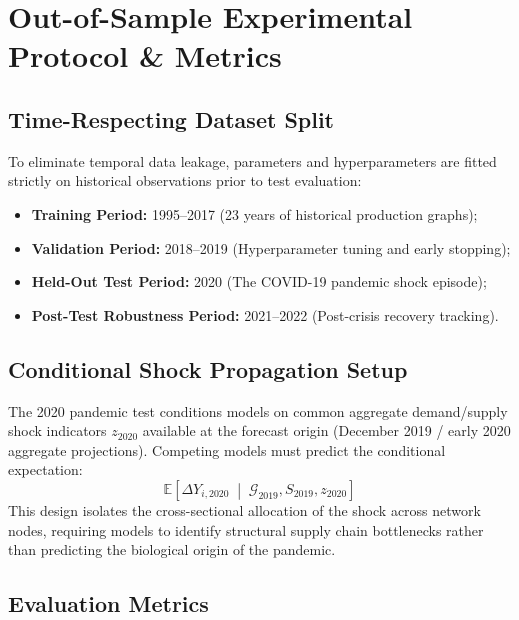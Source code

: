 \documentclass[11pt,a4paper]{article}
\newcommand{\E}{\mathbb{E}}
\newcommand{\G}{\mathcal{G}}
\begin{document}
\section{Out-of-Sample Experimental Protocol \& Metrics}
\label{sec:experiment}

\subsection{Time-Respecting Dataset Split}

To eliminate temporal data leakage, parameters and hyperparameters are fitted strictly on historical observations prior to test evaluation:
\begin{itemize}
    \item \textbf{Training Period:} 1995--2017 (23 years of historical production graphs);
    \item \textbf{Validation Period:} 2018--2019 (Hyperparameter tuning and early stopping);
    \item \textbf{Held-Out Test Period:} 2020 (The COVID-19 pandemic shock episode);
    \item \textbf{Post-Test Robustness Period:} 2021--2022 (Post-crisis recovery tracking).
\end{itemize}

\subsection{Conditional Shock Propagation Setup}

The 2020 pandemic test conditions models on common aggregate demand/supply shock indicators $z_{2020}$ available at the forecast origin (December 2019 / early 2020 aggregate projections). Competing models must predict the conditional expectation:
\begin{equation}
    \E \left[ \Delta Y_{i,2020} \;\middle|\; \G_{2019}, S_{2019}, z_{2020} \right]
\end{equation}
This design isolates the cross-sectional allocation of the shock across network nodes, requiring models to identify structural supply chain bottlenecks rather than predicting the biological origin of the pandemic.

\subsection{Evaluation Metrics}
\end{document}
